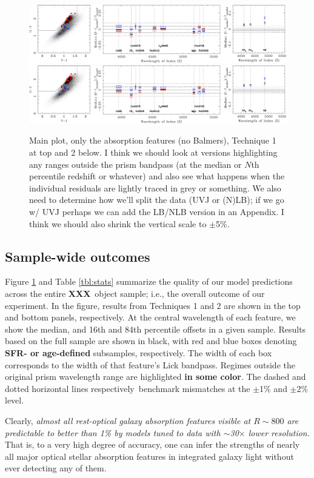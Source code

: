 \documentclass[a4paper,fleqn,usenatbib]{mnras}
\newcommand{\resp}{respectively}
\newcommand{\bfr}{\bf\color{red}}
\newcommand{\bfb}{\color{myblue}}
\newcommand{\ntot}{{\bfr XXX}} %
\begin{document}
\begin{figure}
\includegraphics[width = \textwidth]{residuals}
\includegraphics[width = \textwidth]{residuals}
\caption{\bfb Main plot, only the absorption features (no Balmers), Technique 1 at top and 2 below.
		I think we should look at versions highlighting any ranges outside the prism bandpass 
		(at the median or $N$th percentile redshift or whatever) and also see what happens when
		the individual residuals are lightly traced in grey or something. We also need to determine
		how we'll split the data (UVJ or (N)LB); if we go w/ UVJ perhaps we can add the LB/NLB
		version in an Appendix. I think we should also shrink the vertical scale to $\pm$5\%.}
\label{fig:resids}
\end{figure}

\subsection{Sample-wide outcomes}
\label{sec:upshot}

Figure \ref{fig:resids} and Table \ref{tbl:stats} summarize the quality of our model predictions 
across the entire \ntot\ object sample; i.e., the overall outcome of our experiment. In the figure, 
results from Techniques 1 and 2 are shown in the top and bottom panels, \resp. At the central 
wavelength of each feature, we show the median, and 16th and 84th percentile offsets in a given sample. 
Results based on the full sample are shown in black, with red and blue boxes denoting 
{\bfr SFR- or age-defined} subsamples, \resp. The width of each box corresponds to the width of 
that feature's Lick bandpass. Regimes outside the original prism wavelength range are highlighted 
{\bfr in some color}. The dashed and dotted horizontal lines \resp\ benchmark mismatches at the 
$\pm$1\% and $\pm$2\% level.

Clearly, {\it almost all rest-optical galaxy absorption features 
visible at $R\sim800$ are predictable to better than 1\% by models tuned to data with $\sim$30$\times$
lower resolution.} That is, to a very high degree of accuracy, one can infer the strengths of nearly all 
major optical stellar absorption features in integrated galaxy light without ever detecting any of them.
\end{document}
